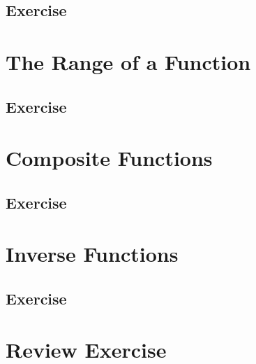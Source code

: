 \documentclass[
  11pt,
  openany]{book}
\begin{document}
\newpage

\subsection*{Exercise}\label{exercise-22}

\newpage

\section{The Range of a Function}\label{the-range-of-a-function}

\newpage

\subsection*{Exercise}\label{exercise-23}

\newpage

\section{Composite Functions}\label{composite-functions}

\newpage

\subsection*{Exercise}\label{exercise-24}

\newpage

\section{Inverse Functions}\label{inverse-functions}

\newpage

\subsection*{Exercise}\label{exercise-25}

\newpage

\section*{Review Exercise}\label{review-exercise-4}
\end{document}
